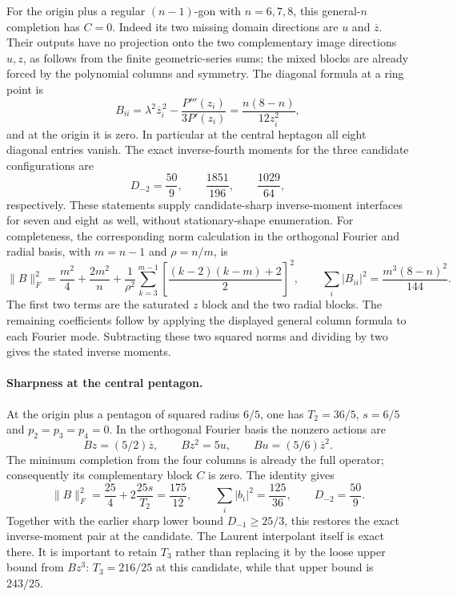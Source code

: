 \documentclass[11pt]{article}
\theoremstyle{remark}
\numberwithin{equation}{section}
\begin{document}
For the origin plus a regular $(n-1)$-gon with $n=6,7,8$, this
general-$n$ completion has $C=0$. Indeed its two missing domain
directions are $u$ and $\overline z$. Their outputs have no projection
onto the two complementary image directions $u,z$, as follows from
the finite geometric-series sums; the mixed blocks are already forced
by the polynomial columns and symmetry. The diagonal formula at a
ring point is
\[
 B_{ii}=\lambda^2\overline z_i^{\,2}
                -\frac{P'''(z_i)}{3P'(z_i)}
        =\frac{n(8-n)}{12z_i^2},
\]
and at the origin it is zero. In particular at the central heptagon
all eight diagonal entries vanish. The exact inverse-fourth moments
for the three candidate configurations are
\[
            D_{-2}=\frac{50}9,\qquad
                    \frac{1851}{196},\qquad\frac{1029}{64},
\]
respectively. These statements supply candidate-sharp inverse-moment
interfaces for seven and eight as well, without stationary-shape
enumeration.
For completeness, the corresponding norm calculation in the orthogonal
Fourier and radial basis, with $m=n-1$ and $\rho=n/m$, is
\[
 \|B\|_F^2=\frac{m^2}4+\frac{2m^2}n
  +\frac1{\rho^2}\sum_{k=3}^{m-1}
             \left[\frac{(k-2)(k-m)+2}{2}\right]^2,
 \qquad
 \sum_i|B_{ii}|^2=\frac{m^3(8-n)^2}{144}.
\]
The first two terms are the saturated $z$ block and the two radial
blocks. The remaining coefficients follow by applying the displayed
general column formula to each Fourier mode. Subtracting these two
squared norms and dividing by two gives the stated inverse moments.

\paragraph{Sharpness at the central pentagon.}
At the origin plus a pentagon of squared radius $6/5$, one has
$T_2=36/5$, $s=6/5$ and $p_2=p_3=p_4=0$. In the orthogonal Fourier
basis the nonzero actions are
\[
 Bz=(5/2)\overline z,\qquad Bz^2=5u,
                         \qquad Bu=(5/6)\overline z^2.
\]
The minimum completion from the four columns is already the full
operator; consequently its complementary block $C$ is zero. The
identity gives
\[
 \|B\|_F^2=\frac{25}4+2\frac{25s}{T_2}
           =\frac{175}{12},\qquad
 \sum_i|b_i|^2=\frac{125}{36},\qquad D_{-2}=\frac{50}9.
\]
Together with the earlier sharp lower bound $D_{-1}\ge25/3$, this
restores the exact inverse-moment pair at the candidate. The Laurent
interpolant itself is exact there. It is important to retain $T_3$
rather than replacing it by the loose upper bound from $Bz^3$:
$T_3=216/25$ at this candidate, while that upper bound is $243/25$.
\end{document}
